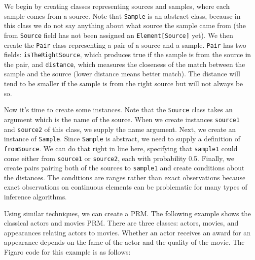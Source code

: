 We begin by creating classes representing sources and samples, where each sample comes from a source. Note that \texttt{Sample} is an abstract class, because in this class we do not say anything about what source the sample came from (the from \texttt{Source} field has not been assigned an \texttt{Element[Source]} yet). We then create the \texttt{Pair} class representing a pair of a source and a sample. \texttt{Pair} has two fields: \texttt{isTheRightSource}, which produces true if the sample is from the source in the pair, and \texttt{distance}, which measures the closeness of the match between the sample and the source (lower distance means better match). The distance will tend to be smaller if the sample is from the right source but will not always be so.

Now it's time to create some instances. Note that the \texttt{Source} class takes an argument which is the name of the source. When we create instances \texttt{source1} and \texttt{source2} of this class, we supply the name argument. Next, we create an instance of \texttt{Sample}. Since \texttt{Sample} is abstract, we need to supply a definition of \texttt{fromSource}. We can do that right in line here, specifying that \texttt{sample1} could come either from \texttt{source1} or \texttt{source2}, each with probability 0.5. Finally, we create pairs pairing both of the sources to \texttt{sample1} and create conditions about the distances. The conditions are ranges rather than exact observations because exact observations on continuous elements can be problematic for many types of inference algorithms.

Using similar techniques, we can create a PRM. The following example shows the classical actors and movies PRM. There are three classes: actors, movies, and appearances relating actors to movies. Whether an actor receives an award for an appearance depends on the fame of the actor and the quality of the movie. The Figaro code for this example is as follows:

